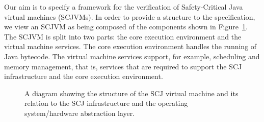 \documentclass[a4paper,10pt]{report}
\begin{document}

Our aim is to specify a framework for the verification of Safety-Critical Java
virtual machines (SCJVMs).  In order to provide a structure to the
specification, we view an SCJVM as being composed of the components shown in
Figure~\ref{scjvm-fig}.  The SCJVM is split into two parts: the core execution
environment and the virtual machine services. The core execution environment
handles the running of Java bytecode.  The virtual machine services support, for
example, scheduling and memory management, that is, services that are required
to support the SCJ infrastructure and the core execution environment.

\begin{figure}[ht]
  \centering
  \caption{A diagram showing the structure of the SCJ virtual machine and its
    relation to the SCJ infrastructure and the operating system/hardware
    abstraction layer.}
  \label{scjvm-fig}
\end{figure}
\end{document}
